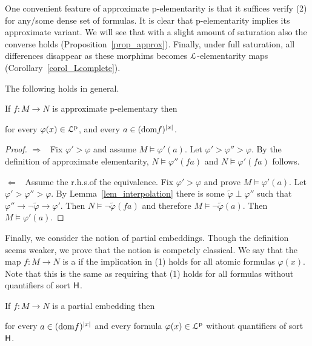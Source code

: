 \documentclass[10pt,oneside]{amsproc}
\renewcommand*{\emph}[1]{%
   \smash{\tikz[baseline]\node[rectangle, fill=teal!25, rounded corners, inner xsep=0.5ex, inner ysep=0.2ex, anchor=base, minimum height = 2.7ex]{\strut #1};}}
\begin{document}

One convenient feature of approximate p-elementarity is that it suffices verify (2) for any/some dense set of formulas.
It is clear that p-elementarity implies its approximate variant.
We will see that with a slight amount of saturation also the converse holds (Proposition~\ref{prop_approx}).
Finally, under full saturation, all differences disappear as these morphims becomes ${\EuScript L}$-elementarity maps (Corollary~\ref{corol_Lcomplete}).

The following holds in general.

\begin{fact}\label{fact_HImorphisms}
  If $f:M\to N$ is approximate p-elementary then


  for every $\varphi(x)\in{\EuScript L}^{\rm p}$, and every $a\in({\rm dom }f)^{|x|}$.
\end{fact}

\begin{proof}
  $\Rightarrow$ \ Fix $\varphi'>\varphi$ and assume $M\models\varphi'(a)$.
  Let  $\varphi'>\varphi''>\varphi$.
  By the definition of approximate elementarity, $N\models\varphi''(fa)$ and $N\models\varphi'(fa)$ follows.
  
  $\Leftarrow$  \ 
  Assume the r.h.s.\@ of the equivalence.
  Fix $\varphi'>\varphi$ and prove $M\models\varphi'(a)$.
  Let  $\varphi'>\varphi''>\varphi$.
  By Lemma~\ref{lem_interpolation} there is some $\tilde{\varphi}\perp\varphi''$ such that $\varphi''\rightarrow\neg\tilde{\varphi}\rightarrow\varphi'$.
  Then $N\models\neg\tilde{\varphi}(fa)$ and therefore  $M\models\neg\tilde{\varphi}(a)$.
  Then $M\models\varphi'(a)$.
\end{proof}

Finally, we consider the notion of partial embeddings.
Though the definition seems weaker, we prove that the notion is competely classical.
We say that the map $f:M\to N$ is a \emph{partial embedding\/} if the implication in (1) holds for all atomic formulas $\varphi(x)$.
Note that this is the same as requiring that (1) holds for all formulas without quantifiers of sort ${\sf H}$.

\begin{fact}\label{fact_partial_emb}
  If $f:M\to N$ is a partial embedding then 


  for every $a\in({\rm dom }f)^{|x|}$ and every formula $\varphi(x)\in{\EuScript L}^{\rm p}$ without quantifiers of sort ${\sf H}$.
\end{fact}
\end{document}
